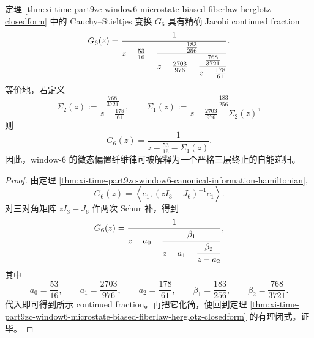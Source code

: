 \begin{corollary}\label{cor:xi-time-part9zc-window6-three-layer-selfenergy-jfraction}
定理 \ref{thm:xi-time-part9zc-window6-microstate-biased-fiberlaw-herglotz-closedform} 中的 Cauchy--Stieltjes 变换 \(G_6\) 具有精确 Jacobi continued fraction
\[
G_6(z)
=
\frac{1}{
z-\frac{53}{16}
-\cfrac{\frac{183}{256}}{
z-\frac{2703}{976}
-\cfrac{\frac{768}{3721}}{
z-\frac{178}{61}
}}}.
\]
等价地，若定义
\[
\Sigma_2(z):=\frac{\frac{768}{3721}}{z-\frac{178}{61}},
\qquad
\Sigma_1(z):=\frac{\frac{183}{256}}{z-\frac{2703}{976}-\Sigma_2(z)},
\]
则
\[
G_6(z)=\frac{1}{z-\frac{53}{16}-\Sigma_1(z)}.
\]
因此，window-\(6\) 的微态偏置纤维律可被解释为一个严格三层终止的自能递归。
\end{corollary}
\begin{proof}
由定理 \ref{thm:xi-time-part9zc-window6-canonical-information-hamiltonian},
\[
G_6(z)=\left\langle e_1,(zI_3-J_6)^{-1}e_1\right\rangle.
\]
对三对角矩阵 \(zI_3-J_6\) 作两次 Schur 补，得到
\[
G_6(z)
=
\frac{1}{
z-a_0-\cfrac{\beta_1}{z-a_1-\cfrac{\beta_2}{z-a_2}}},
\]
其中
\[
a_0=\frac{53}{16},\qquad
a_1=\frac{2703}{976},\qquad
a_2=\frac{178}{61},\qquad
\beta_1=\frac{183}{256},\qquad
\beta_2=\frac{768}{3721}.
\]
代入即可得到所示 continued fraction。再把它化简，便回到定理 \ref{thm:xi-time-part9zc-window6-microstate-biased-fiberlaw-herglotz-closedform} 的有理闭式。证毕。
\end{proof}
\endinput
